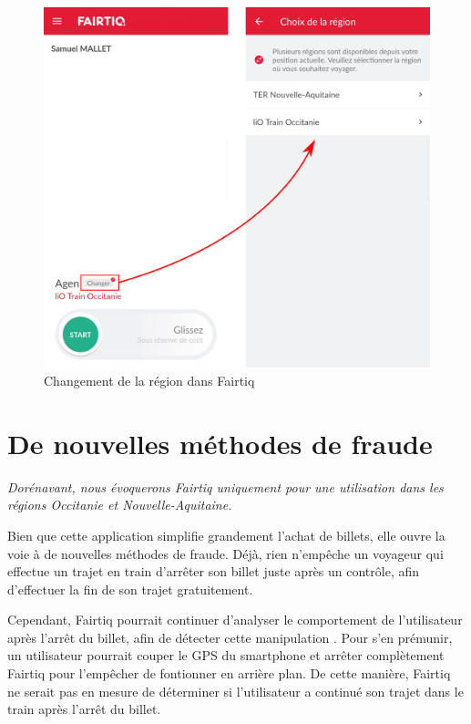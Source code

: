 \documentclass[a4paper]{article}
\begin{document}
\begin{figure}[h]
  \centering
  \includegraphics[width=\textwidth]{illustrations/images/changement_regions/changement_illustration.png}
  \caption{Changement de la région dans Fairtiq}
  \label{fig:changement_region}
\end{figure}





\clearpage

\section{De nouvelles méthodes de fraude}

\textit{Dorénavant, nous évoquerons Fairtiq uniquement pour une utilisation dans les régions Occitanie et Nouvelle-Aquitaine.}


Bien que cette application simplifie grandement l'achat de billets, elle ouvre la voie à de nouvelles méthodes de fraude.
Déjà, rien n'empêche un voyageur qui effectue un trajet en train d'arrêter son billet juste après un contrôle,
afin d'effectuer la fin de son trajet gratuitement.

Cependant, Fairtiq pourrait continuer d'analyser le comportement de l'utilisateur après l'arrêt du billet, afin de
détecter cette manipulation \cite{stop-billet-avant-descente}.
Pour s'en prémunir, un utilisateur pourrait couper le GPS du smartphone et arrêter complètement Fairtiq pour l'empêcher de fontionner en arrière plan.
De cette manière, Fairtiq ne serait pas en mesure de déterminer si l'utilisateur a continué son trajet dans le train après l'arrêt du billet.
\end{document}
